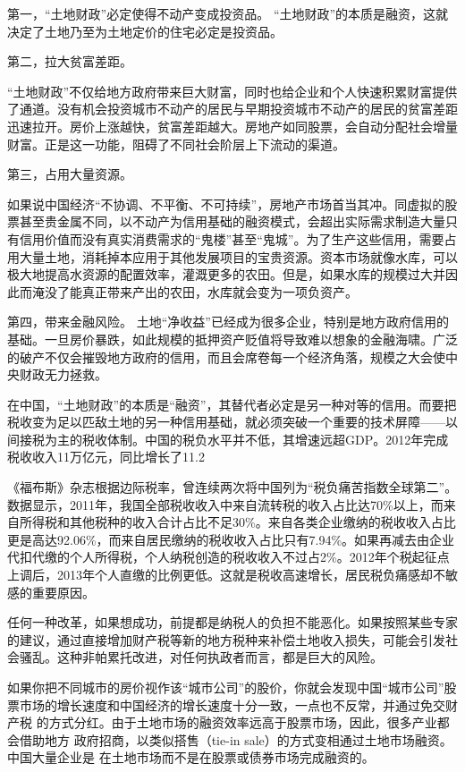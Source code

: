 第一，“土地财政”必定使得不动产变成投资品。
“土地财政”的本质是融资，这就决定了土地乃至为土地定价的住宅必定是投资品。

第二，拉大贫富差距。

“土地财政”不仅给地方政府带来巨大财富，同时也给企业和个人快速积累财富提供了通道。没有机会投资城市不动产的居民与早期投资城市不动产的居民的贫富差距迅速拉开。房价上涨越快，贫富差距越大。房地产如同股票，会自动分配社会增量财富。正是这一功能，阻碍了不同社会阶层上下流动的渠道。

第三，占用大量资源。

如果说中国经济“不协调、不平衡、不可持续”，房地产市场首当其冲。同虚拟的股票甚至贵金属不同，以不动产为信用基础的融资模式，会超出实际需求制造大量只有信用价值而没有真实消费需求的“鬼楼”甚至“鬼城”。为了生产这些信用，需要占用大量土地，消耗掉本应用于其他发展项目的宝贵资源。资本市场就像水库，可以极大地提高水资源的配置效率，灌溉更多的农田。但是，如果水库的规模过大并因此而淹没了能真正带来产出的农田，水库就会变为一项负资产。

第四，带来金融风险。
土地“净收益”已经成为很多企业，特别是地方政府信用的基础。一旦房价暴跌，如此规模的抵押资产贬值将导致难以想象的金融海啸。广泛的破产不仅会摧毁地方政府的信用，而且会席卷每一个经济角落，规模之大会使中央财政无力拯救。


在中国，“土地财政”的本质是“融资”，其替代者必定是另一种对等的信用。而要把税收变为足以匹敌土地的另一种信用基础，就必须突破一个重要的技术屏障——以间接税为主的税收体制。中国的税负水平并不低，其增速远超GDP。2012年完成税收收入11万亿元，同比增长了11.2%

《福布斯》杂志根据边际税率，曾连续两次将中国列为“税负痛苦指数全球第二”。
数据显示，2011年，我国全部税收收入中来自流转税的收入占比达70\%以上，而来自所得税和其他税种的收入合计占比不足30\%。来自各类企业缴纳的税收收入占比更是高达92.06\%，而来自居民缴纳的税收收入占比只有7.94\%。如果再减去由企业代扣代缴的个人所得税，个人纳税创造的税收收入不过占2\%。2012年个税起征点上调后，2013年个人直缴的比例更低。这就是税收高速增长，居民税负痛感却不敏感的重要原因。

任何一种改革，如果想成功，前提都是纳税人的负担不能恶化。如果按照某些专家的建议，通过直接增加财产税等新的地方税种来补偿土地收入损失，可能会引发社会骚乱。这种非帕累托改进，对任何执政者而言，都是巨大的风险。

如果你把不同城市的房价视作该“城市公司”的股价，你就会发现中国“城市公司”股
票市场的增长速度和中国经济的增长速度十分一致，一点也不反常，并通过免交财产税
的方式分红。由于土地市场的融资效率远高于股票市场，因此，很多产业都会借助地方
政府招商，以类似搭售（tie-in sale）的方式变相通过土地市场融资。中国大量企业是
在土地市场而不是在股票或债券市场完成融资的。

